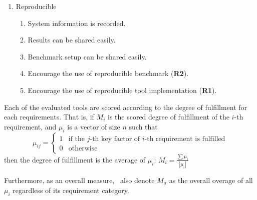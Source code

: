 \begin{enumerate}[noitemsep]
    \item Reproducible
    \begin{enumerate}[noitemsep]
        \item System information is recorded.
        \item Results can be shared easily.
        \item Benchmark setup can be shared easily.
        \item Encourage the use of reproducible benchmark (\textbf{R2}).
        \item Encourage the use of reproducible tool implementation (\textbf{R1}).
    \end{enumerate}
\end{enumerate}

Each of the evaluated tools are scored according to the degree of fulfillment for each requirements.
That is, if $M_i$ is the scored degree of fulfillment of the $i$-th requirement, and $\mu_{i}$ is a vector of size $n$ such that
\[
    \mu_{ij} =
    \begin{cases}
        1 & \text{if the $j$-th key factor of $i$-th requirement is fulfilled} \\
        0 & \text{otherwise}
    \end{cases}
\]
then the degree of fulfillment is the average of $\mu_i$:
\(
    M_i = \frac{\sum\mu_{i}}{|\mu_i|}
\)

Furthermore, as an overall measure, \first~also denote $M_\sigma$ as the overall overage of all $\mu_{i}$ regardless of its requirement category.


